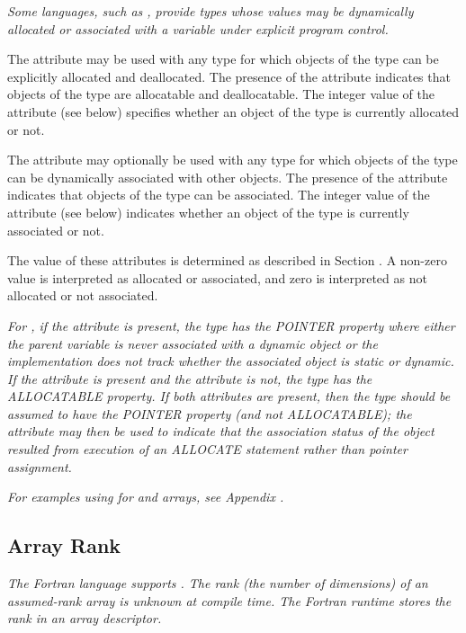 \textit{Some languages, such as ,
provide types whose values
may be dynamically allocated or associated with a variable
under explicit program control.}

The\hypertarget{chap:DWATallocatedallocationstatusoftypes}{}
\DWATallocatedDEFN{} attribute
may be used with any
type for which objects of the type can be explicitly allocated
and deallocated. The presence of the attribute indicates that
objects of the type are allocatable and deallocatable. The
integer value of the attribute (see below) specifies whether
an object of the type is currently allocated or not.

The\hypertarget{chap:DWATassociatedassociationstatusoftypes}{} 
\DWATassociatedDEFN{} attribute 
may 
optionally be used with
any type for which objects of the type can be dynamically
associated with other objects. The presence of the attribute
indicates that objects of the type can be associated. The
integer value of the attribute (see below) indicates whether
an object of the type is currently associated or not.

The value of these attributes is determined as described in
Section .
\bbeb
A non-zero value is interpreted as allocated or associated,
and zero is interpreted as not allocated or not associated.

\textit{For , 
if the \DWATassociated{} 
attribute is present,
the type has the POINTER property where either the parent
variable is never associated with a dynamic object or the
implementation does not track whether the associated object
is static or dynamic. If the \DWATallocated{} attribute is
present and the \DWATassociated{} attribute is not, the type
has the ALLOCATABLE property. If both attributes are present,
then the type should be assumed to have the POINTER property
(and not ALLOCATABLE); the \DWATallocated{} attribute may then
be used to indicate that the association status of the object
resulted from execution of an ALLOCATE statement rather than
pointer assignment.}

\textit{For examples using 
\DWATallocated{} for  and 
arrays, 
see Appendix .}

\subsection{Array Rank}
\label{chap:DWATrank}
\textit{The Fortran language supports . The
  rank (the number of dimensions) of an assumed-rank array is unknown
  at compile time. The Fortran runtime stores the rank in an array
  descriptor.}

